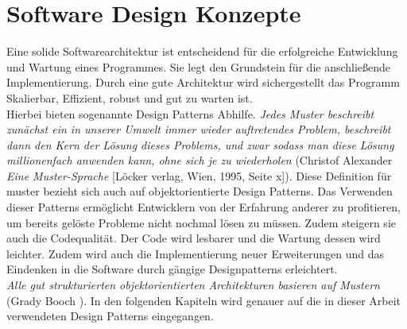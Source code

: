 \section{Software Design Konzepte}
Eine solide Softwarearchitektur ist entscheidend für die erfolgreiche Entwicklung und Wartung eines Programmes. Sie legt den Grundstein für die anschließende Implementierung. Durch eine gute Architektur wird sichergestellt das Programm Skalierbar, Effizient, robust und gut zu warten ist.\\
Hierbei bieten sogenannte Design Patterns Abhilfe. \textit{Jedes Muster beschreibt zunächst ein in unserer Umwelt immer wieder auftretendes Problem, beschreibt dann den Kern der Lösung dieses Problems, und zwar sodass man diese Lösung millionenfach anwenden kann, ohne sich je zu wiederholen} (Christof Alexander \textit{Eine Muster-Sprache} [Löcker verlag, Wien, 1995, Seite x]). Diese Definition für muster bezieht sich auch auf objektorientierte Design Patterns. Das Verwenden dieser Patterns ermöglicht Entwicklern von der Erfahrung anderer zu profitieren, um bereits gelöste Probleme nicht nochmal lösen zu müssen. Zudem steigern sie auch die Codequalität. Der Code wird lesbarer und die Wartung dessen wird leichter. Zudem wird auch die Implementierung neuer Erweiterungen und das Eindenken in die Software durch gängige Designpatterns erleichtert. \cite[S.25 ff]{DesignPatterns}\\
\textit{Alle gut strukturierten objektorientierten Architekturen basieren auf Mustern} (Grady Booch \cite[S.21]{DesignPatterns}).
In den folgenden Kapiteln wird genauer auf die in dieser Arbeit verwendeten Design Patterns eingegangen.      

